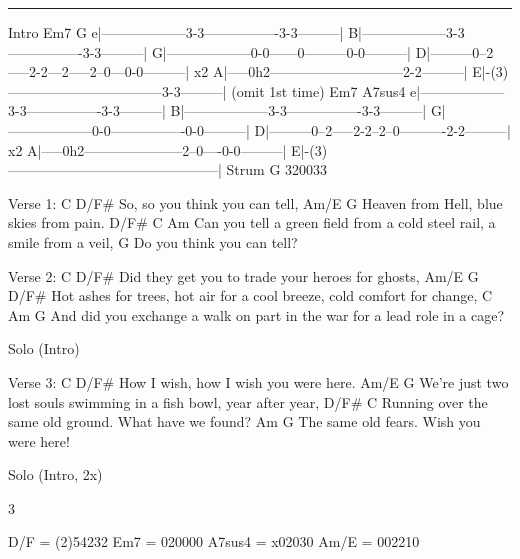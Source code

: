 \noindent\rule{\columnwidth}{1pt}

\begin{lsttab}
Intro
                    Em7                G
e|------------------3-3----------------3-3---------|
B|------------------3-3----------------3-3---------|
G|------------------0-0------0---------0-0---------|
D|---------0--2-----2-2---2-----2--0---0-0---------| x2
A|-----0h2-----------------------------2-2---------|
E|-(3)---------------------------------3-3---------|
  (omit 1st time)
                    Em7               A7sus4
e|------------------3-3----------------3-3---------|
B|------------------3-3----------------3-3---------|
G|------------------0-0----------------0-0---------|
D|---------0--2-----2-2--2--0----------2-2---------| x2
A|-----0h2---------------------2--0----0-0---------|
E|-(3)---------------------------------------------|
Strum G 320033
\end{lsttab}
\begin{lstsong}
Verse 1:
C                           D/F#
  So, so you think you can tell,
             Am/E                   G
Heaven from Hell, blue skies from pain.
                     D/F#                    C                     Am
Can you tell a green field from a cold steel rail, a smile from a veil,
                      G
Do you think you can tell?

Verse 2:
                      C                   D/F#
Did they get you to trade your heroes for ghosts,
                Am/E                  G                            D/F#
Hot ashes for trees, hot air for a cool breeze, cold comfort for change,
                C                           Am                       G
And did you exchange a walk on part in the war for a lead role in a cage?
 
Solo (Intro) 
 
Verse 3:
C                                  D/F#
  How I wish, how I wish you were here.
           Am/E                                   G
We're just two lost souls swimming in a fish bowl, year after year,
D/F#                                 C
    Running over the same old ground. What have we found?
             Am                     G
The same old fears. Wish you were here!
 
Solo (Intro, 2x)
\end{lstsong}
\vspace{-0.5em}
\begin{multicols}{3}
\begin{lsttab}
D/F    = (2)54232
Em7    = 020000
A7sus4 = x02030
Am/E   = 002210
\end{lsttab}
\end{multicols}
\newpage

